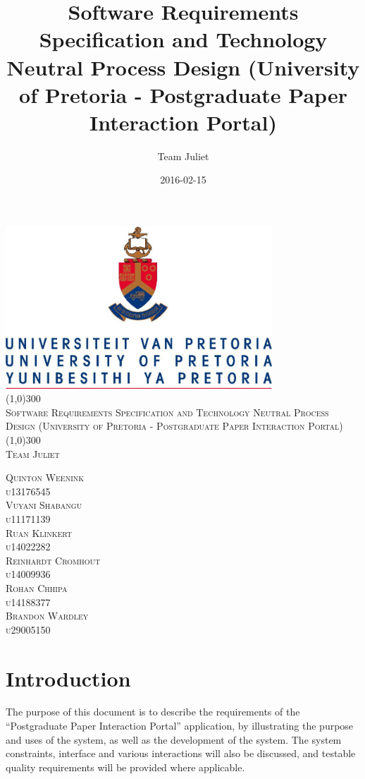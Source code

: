 \documentclass{article}
\title{
Software Requirements Specification and 
Technology Neutral Process Design
(University of Pretoria - Postgraduate Paper Interaction Portal)
}
\date{2016-02-15}
\author{Team Juliet}
\begin{document}
\begin{titlepage}
	\begin{center}
		\includegraphics[width=10cm]{UP.jpg}  \\
		[1cm]
		\line(1,0){300} \\
		[0.4cm]
		\textsc{\huge
			Software Requirements Specification and 
			Technology Neutral Process Design
			(University of Pretoria - Postgraduate Paper Interaction Portal)
		} \\
		[0.1cm]
		\line(1,0){300} \\
		[0.4cm]
		\textsc{\Large
			Team Juliet
		} \\

	\end{center}
	\begin{flushright}
	\textsc{\Large
	Quinton Weenink\\ 
	u13176545\\
	Vuyani Shabangu\\
	u11171139\\
	Ruan Klinkert\\
	u14022282\\
	Reinhardt Cromhout\\
	u14009936\\
	Rohan Chhipa\\
	u14188377\\
	Brandon Wardley\\
	u29005150\\
	}
	\end{flushright}
\end{titlepage}

\tableofcontents
\thispagestyle{empty}
\cleardoublepage

\setcounter{page}{1}
\section{Introduction}
The purpose of this document is to describe the requirements of the “Postgraduate Paper Interaction Portal” application, by illustrating the purpose and uses of the system, as well as the development of the system. The system constraints, interface and various interactions will also be discussed, and testable quality requirements will be provided where applicable.
\end{document}

